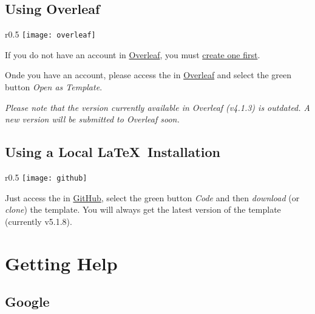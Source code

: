 \subsection{Using Overleaf}
\label{sub:using_overleaf}

\begin{wrapfigure}{r}{0.5\linewidth}
\vspace*{-15ex}\texttt{[image: overleaf]}%
\end{wrapfigure}

If you do not have an account in \href{https://www.overleaf.com?r=f5160636&rm=d&rs=b}{Overleaf}, you must \href{https://www.overleaf.com?r=f5160636&rm=d&rs=b}{create one first}.

Onde you have an account, please access the  in \href{https://www.overleaf.com/latex/templates/new-university-of-lisbon-universidade-nova-de-lisboa-slash-unl-thesis-template/fwbztcrptjmg}{Overleaf} and select the green button \emph{Open as Template}. 

\emph{Please note that the version currently available in Overleaf (v4.1.3) is outdated. A new version will be submitted to Overleaf soon.}  

\subsection{Using a Local \LaTeX\ Installation}
\label{sub:using_local_latex}

\begin{wrapfigure}{r}{0.5\linewidth}
\vspace*{-15ex}\texttt{[image: github]}%
\end{wrapfigure}

Just access the  in \href{https://github.com/joaomlourenco/novathesis}{GitHub}, select the green button \emph{Code} and then \emph{download} (or \emph{clone}) the template.  You will always get the latest version of the template (currently v5.1.8).


\section{Getting Help}
\label{sec:getting_help}

\begin{center}  
\end{center}
 
\subsection{Google}
\label{sub:group_google}

